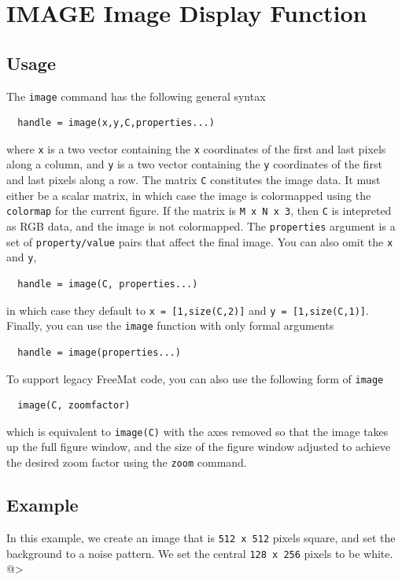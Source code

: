 \section{IMAGE Image Display Function}

\subsection{Usage}

The \verb|image| command has the following general syntax
\begin{verbatim}
  handle = image(x,y,C,properties...)
\end{verbatim}
where \verb|x| is a two vector containing the \verb|x| coordinates
of the first and last pixels along a column, and \verb|y| is a
two vector containing the \verb|y| coordinates of the first and
last pixels along a row.  The matrix \verb|C| constitutes the
image data.  It must either be a scalar matrix, in which case
the image is colormapped using the  \verb|colormap| for the current
figure.  If the matrix is \verb|M x N x 3|, then \verb|C| is intepreted
as RGB data, and the image is not colormapped.  The \verb|properties|
argument is a set of \verb|property/value| pairs that affect the
final image.  You can also omit the \verb|x| and \verb|y|, 
\begin{verbatim}
  handle = image(C, properties...)
\end{verbatim}
in which case they default to \verb|x = [1,size(C,2)]| and 
\verb|y = [1,size(C,1)]|.  Finally, you can use the \verb|image| function
with only formal arguments
\begin{verbatim}
  handle = image(properties...)
\end{verbatim}

To support legacy FreeMat code, you can also use the following
form of \verb|image|
\begin{verbatim}
  image(C, zoomfactor)
\end{verbatim}
which is equivalent to \verb|image(C)| with the axes removed so that
the image takes up the full figure window, and the size of the
figure window adjusted to achieve the desired zoom factor using the
\verb|zoom| command.
\subsection{Example}

In this example, we create an image that is \verb|512 x 512| pixels
square, and set the background to a noise pattern.  We set the central
\verb|128 x 256| pixels to be white.
@>

